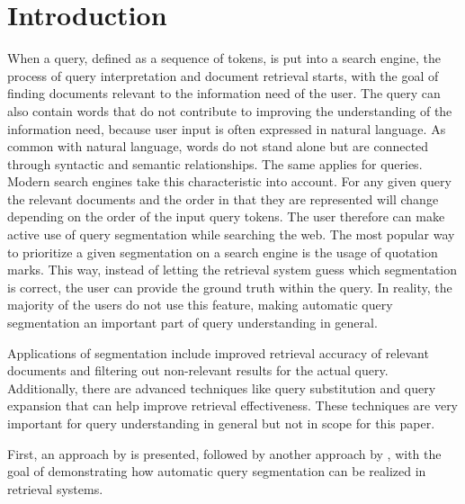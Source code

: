 \section{Introduction} \label{introduction}
When a query, defined as a sequence of tokens, is put into a search engine, the process of query interpretation and document retrieval starts, with the goal of finding documents relevant to the information need of the user. The query can also contain words that do not contribute to improving the understanding of the information need, because user input is often expressed in natural language. As common with natural language, words do not stand alone but are connected through syntactic and semantic relationships. The same applies for queries. Modern search engines take this characteristic into account. For any given query the relevant documents and the order in that they are represented will change depending on the order of the input query tokens. The user therefore can make active use of query segmentation while searching the web. The most popular way to prioritize a given segmentation on a search engine is the usage of quotation marks. This way, instead of letting the retrieval system guess which segmentation is correct, the user can provide the ground truth within the query. In reality, the majority of the users do not use this feature, making automatic query segmentation an important part of query understanding in general. 

Applications of segmentation include improved retrieval accuracy of relevant documents and filtering out non-relevant results for the actual query. Additionally, there are advanced techniques like query substitution and query expansion that can help improve retrieval effectiveness. These techniques are very important for query understanding in general but not in scope for this paper.

First, an approach by \citet{Risvik:2003} is presented, followed by another approach by \citet{Bergsma:2007}, with the goal of demonstrating how automatic query segmentation can be realized in retrieval systems.